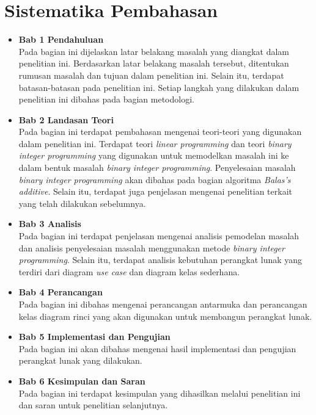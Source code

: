 \section{Sistematika Pembahasan}
\label{sec:sispem}
\begin{itemize}
	\item \textbf{Bab 1 Pendahuluan}\\
	Pada bagian ini dijelaskan latar belakang masalah yang diangkat dalam penelitian ini. Berdasarkan latar belakang masalah tersebut, ditentukan rumusan masalah dan tujuan dalam penelitian ini. Selain itu, terdapat batasan-batasan pada penelitian ini. Setiap langkah yang dilakukan dalam penelitian ini dibahas pada bagian metodologi.
	\item \textbf{Bab 2 Landasan Teori}\\
	Pada bagian ini terdapat pembahasan mengenai teori-teori yang digunakan dalam penelitian ini. Terdapat teori \textit{linear programming} dan teori \textit{binary integer programming} yang digunakan untuk memodelkan masalah ini ke dalam bentuk masalah \textit{binary integer programming}. Penyelesaian masalah \textit{binary integer programming} akan dibahas pada bagian algoritma \textit{Balas's additive}. Selain itu, terdapat juga penjelasan mengenai penelitian terkait yang telah dilakukan sebelumnya.
	\item \textbf{Bab 3 Analisis}\\
	Pada bagian ini terdapat penjelasan mengenai analisis pemodelan masalah dan analisis penyelesaian masalah menggunakan metode \textit{binary integer programming}. Selain itu, terdapat analisis kebutuhan perangkat lunak yang terdiri dari diagram \textit{use case} dan diagram kelas sederhana.
	\item \textbf{Bab 4 Perancangan}\\
	Pada bagian ini dibahas mengenai perancangan antarmuka dan perancangan kelas diagram rinci yang akan digunakan untuk membangun perangkat lunak.
	\item \textbf{Bab 5 Implementasi dan Pengujian}\\
	Pada bagian ini akan dibahas mengenai hasil implementasi dan pengujian perangkat lunak yang dilakukan.
	\item \textbf{Bab 6 Kesimpulan dan Saran}\\
	Pada bagian ini terdapat kesimpulan yang dihasilkan melalui penelitian ini dan saran untuk penelitian selanjutnya.
\end{itemize}